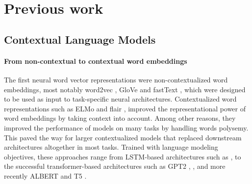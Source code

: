 


\section{Previous work}
\label{relatedwork}
\subsection{Contextual Language Models}
\paragraph{From non-contextual to contextual word embeddings}
The first neural word vector representations were non-contextualized word embeddings, most notably
word2vec \citep{mikolov-etal-2013-distributed}, GloVe \cite{pennington-etal-2014-glove} and fastText \cite{mikolov-etal-2018-advances}, which were designed to be used as input to task-specific neural architectures.
Contextualized word representations such as ELMo \cite{peters-etal-2018-deep} and flair \cite{akbik-etal-2018-contextual}, improved the representational power of word embeddings by taking context into account. Among other reasons, they improved the performance of models on many tasks by handling words polysemy.
This paved the way for larger contextualized models that replaced downstream architectures altogether in most tasks. Trained with language modeling objectives, these approaches range from LSTM-based architectures such as \cite{dai-le-2015-semi}, to the successful transformer-based architectures such
as GPT2 \cite{radford-etal-2019-language}, \bert \cite{devlin-etal-2019-bert}, \roberta \cite{liu-etal-2019-roberta} and more recently ALBERT \cite{lan-etal-2020-albert} and T5 \cite{raffel-etal-2020-exploring}.


